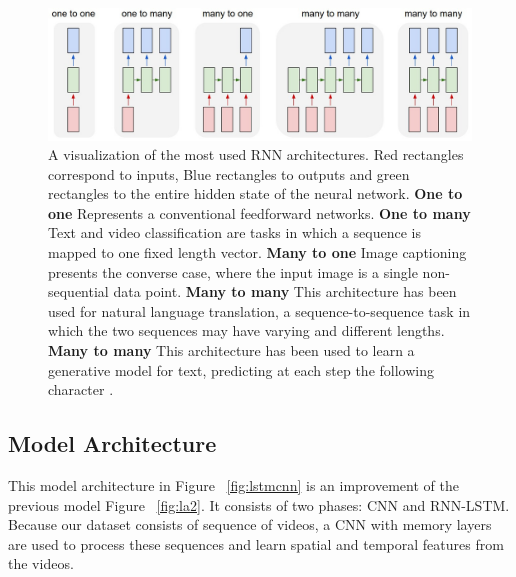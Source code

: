 \begin{figure}[ht]
\centering
\includegraphics[width=0.8\columnwidth]{Figures/rn1}
\decoRule
\caption[A visualization of the most used RNN architectures. Red rectangles
correspond to inputs, Blue rectangles to outputs and green rectangles to the entire hidden state of the neural network. \textbf{One to one} Represents a conventional  feedforward networks. \textbf{One to many} Text and video classification are tasks in which a sequence is mapped to one fixed length vector. \textbf{Many to one}
Image captioning presents the converse case, where the input image is a single
non-sequential data point. \textbf{Many to many} This architecture has been used for natural language translation, a sequence-to-sequence task in which the two sequences may
have varying and different lengths. \textbf{Many to many} This architecture has been used to learn
a generative model for text, predicting at each step the following character \citep{lipton2015critical}.]{A visualization of the most used RNN architectures. Red rectangles
correspond to inputs, Blue rectangles to outputs and green rectangles to the entire hidden state of the neural network. \textbf{One to one} Represents a conventional  feedforward networks. \textbf{One to many} Text and video classification are tasks in which a sequence is mapped to one fixed length vector. \textbf{Many to one}
Image captioning presents the converse case, where the input image is a single
non-sequential data point. \textbf{Many to many} This architecture has been used for natural language translation, a sequence-to-sequence task in which the two sequences may
have varying and different lengths. \textbf{Many to many} This architecture has been used to learn
a generative model for text, predicting at each step the following character \citep{lipton2015critical}.}
\label{fig:RNNmanytoonoetypes}
\end{figure}

\subsection{Model Architecture}
This model architecture in Figure ~\ref{fig:lstmcnn} is an improvement of the previous model Figure ~\ref{fig:la2}. It consists of two phases: CNN and RNN-LSTM. Because our dataset consists of sequence of videos, a CNN with memory layers are used to process these sequences and learn spatial and temporal features from the videos.\\

